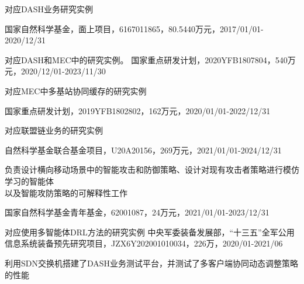 \documentclass{resume}
\begin{document}
\faChevronRight 对应DASH业务研究实例

国家自然科学基金，面上项目，6167011865，80.5440万元，2017/01/01-2020/12/31

\faChevronRight 对应DASH和MEC中的研究实例。
国家重点研发计划，2020YFB1807804，540万元，2020/12/01-2023/11/30

\faChevronRight 对应MEC中多基站协同缓存的研究实例


国家重点研发计划，2019YFB1802802，162万元，2020/01/01-2022/12/31

\faChevronRight 对应联盟链业务的研究实例

自然科学基金联合基金项目，U20A20156，269万元，2021/01/01-2024/12/31

\faChevronRight 负责设计横向移动场景中的智能攻击和防御策略、设计对现有攻击者策略进行模仿学习的智能体
\\以及智能攻防策略的可解释性工作

国家自然科学基金青年基金，62001087，24万元，2021/01/01-2023/12/31

\faChevronRight 对应使用多智能体DRL方法的研究实例
中央军委装备发展部，“十三五”全军公用信息系统装备预先研究项目，JZX6Y202001010034，226万，2020/01-2021/06

\faChevronRight 利用SDN交换机搭建了DASH业务测试平台，并测试了多客户端协同动态调整策略的性能 

\end{document}
